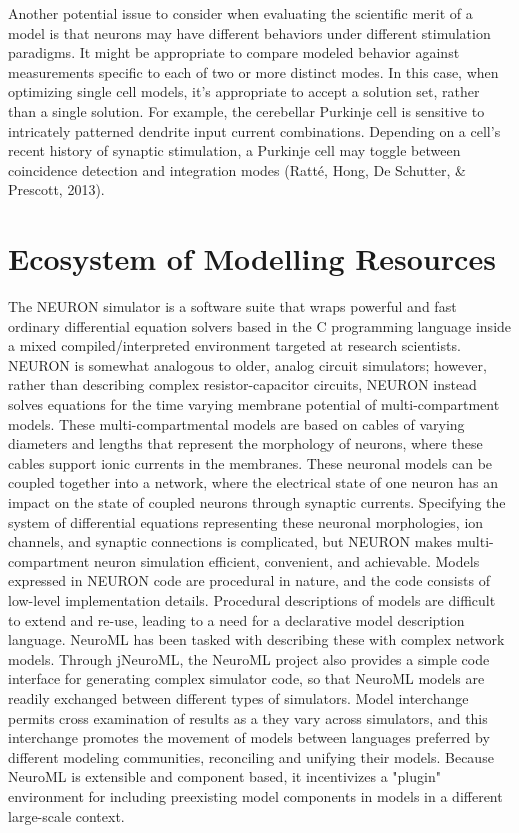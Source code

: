 Another potential issue to consider when evaluating the scientific merit of a model is that neurons may have different behaviors under different stimulation paradigms. It might be appropriate to compare modeled behavior against measurements specific to each of two or more distinct modes. In this case, when optimizing single cell models, it’s appropriate to accept a solution set, rather than a single solution. For example, the cerebellar Purkinje cell is sensitive to intricately patterned dendrite input current combinations. Depending on a cell’s recent history of synaptic stimulation, a Purkinje cell may toggle between coincidence detection and integration modes (Ratté, Hong, De Schutter, \& Prescott, 2013).
\\
\section{Ecosystem of Modelling Resources}
The NEURON simulator is a software suite that wraps powerful and fast ordinary differential equation solvers based in the C programming language inside a mixed compiled/interpreted environment targeted at research scientists. NEURON is somewhat analogous to older, analog circuit simulators; however, rather than describing complex resistor-capacitor circuits, NEURON instead solves equations for the time varying membrane potential of multi-compartment models.\newline
\newline
These multi-compartmental models are based on cables of varying diameters and lengths that represent the morphology of neurons, where these cables support ionic currents in the membranes. These neuronal models can be coupled together into a network, where the electrical state of one neuron has an impact on the state of coupled neurons through synaptic currents. Specifying the system of differential equations representing these neuronal morphologies, ion channels, and synaptic connections is complicated, but NEURON makes multi-compartment neuron simulation efficient, convenient, and achievable. Models expressed in NEURON code are procedural in nature, and the code consists of low-level implementation details. Procedural descriptions of models are difficult to extend and re-use, leading to a need for a declarative model description language. NeuroML has been tasked with describing these with complex network models.\newline
\newline
Through jNeuroML, the NeuroML project also provides a simple code interface for generating complex simulator code, so that NeuroML models are readily exchanged between different types of simulators. Model interchange permits cross examination of results as a they vary across simulators, and this interchange promotes the movement of models between languages preferred by different modeling communities, reconciling and unifying their models. Because NeuroML is extensible and component based, it incentivizes a "plug\-in" environment for including pre\-existing model components in models in a different large-scale context.


